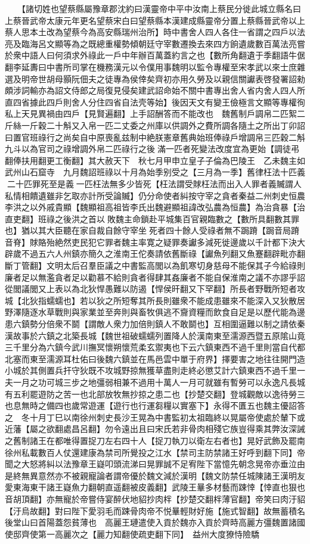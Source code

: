 　　【諸切姓也望蔡縣屬豫章郡沈約曰漢靈帝中平中汝南上蔡民分徙此城立縣名曰上蔡晉武帝太康元年更名望蔡宋白曰望蔡縣本漢建成縣靈帝分置上蔡縣晉武帝以上蔡人思本土改為望蔡今為高安縣瑞州治所】時中書舍人四人各住一省謂之四戶以法亮及臨海呂文顯等為之既總重權勢傾朝廷守宰數遷換去來四方餉遺歲數百萬法亮嘗於衆中語人曰何須求外祿此一戶中年辦百萬蓋約言之也【數所角翻遺于季翻語牛倨翻李延夀曰中書所司掌在機務漢元以令僕用事魏明以監令專權至宋孝武以來士庶雜選及明帝世胡母顥阮佃夫之徒專為侯倖矣齊初亦用久勞及以親信關讞表啓發署詔勑頗涉詞輸亦為詔文侍郎之局復見侵矣建武詔命始不關中書專出舍人省内舍人四人所直四省據此四戶則舍人分住四省自法壳等始】後因天文有變王儉極言文顯等專權徇私上天見異禍由四戶【見賢遍翻】上手詔酬答而不能改也　魏舊制戶調帛二匹絮二斤絲一斤穀二十斛又入帛一匹二丈委之州庫以供調外之費所調各隨土之所出丁卯詔曰置官班祿行之尚矣自中原喪亂兹制中絶朕憲章舊典始班俸祿戶增調帛三匹穀二斛九斗以為官司之祿增調外帛二匹祿行之後滿一匹者死變法改度宜為更始【調徒弔翻俸扶用翻更工衡翻】其大赦天下　秋七月甲申立皇子子倫為巴陵王　乙未魏主如武州山石窟寺　九月魏詔班祿以十月為始季别受之【三月為一季】舊律枉法十匹義二十匹罪死至是義一匹枉法無多少皆死【枉法謂受賕枉法而出入人罪者義贓謂人私情相饋遺雖非乞取亦計所受論贓】仍分命使者糾按守宰之貪者秦益二州刺史恒農李洪之以外戚貴顯【魏顯祖高祖皆李氏出魏避顯祖諱改弘農為恒農】為治貪暴【治直吏翻】班祿之後洪之首以敗魏主命鎖赴平城集百官親臨數之【數所具翻數其罪也】猶以其大臣聽在家自裁自餘守宰坐死者四十餘人受祿者無不跼蹐【跼音局蹐音脊】賕賂殆絶然吏民犯它罪者魏主率寛之疑罪奏讞多減死徙邊歲以千計都下決大辟歲不過五六人州鎮亦簡久之淮南王佗奏請依舊斷祿【讞魚列翻又魚蹇翻辟毗亦翻斷丁管翻】文明太后召羣臣議之中書監高閭以為飢寒切身慈母不能保其子今給祿則廉者足以無濫貪者足以勸慕不給則貪者得肆其姦廉者不能自保淮南之議不亦謬乎詔從閭議閭又上表以為北狄悍愚難以防遏【悍侯旰翻又下罕翻】所長者野戰所短者攻城【北狄指蠕蠕也】若以狄之所短奪其所長則雖衆不能成患雖來不能深入又狄散居野澤隨逐水草戰則與家業並至奔則與畜牧俱逃不齎資糧而飲食自足是以歷代能為邊患六鎮勢分倍衆不鬬【謂敵人衆力加倍則鎮人不敢鬬也】互相圍逼難以制之請依秦漢故事於六鎮之北築長城【魏世祖破蠕蠕列置降人於漢南東至濡源西暨五原隂山竟三千里分為六鎮今武川撫冥懷朔懷荒柔玄禦夷也下云六鎮東西不過千里則當自代都北塞而東至濡源耳杜佑曰後魏六鎮並在馬邑雲中單于府界】擇要害之地往往開門造小城於其側置兵扞守狄既不攻城野掠無獲草盡則走終必懲艾計六鎮東西不過千里一夫一月之功可城三步之地彊弱相兼不過用十萬人一月可就雖有暫勞可以永逸凡長城有五利罷遊防之苦一也北部放牧無抄掠之患二也【抄楚交翻】登城觀敵以逸待勞三也息無時之備四也歲常遊運【遊行也行運芻糧以實塞下】永得不匱五也魏主優詔答之　冬十月丁巳以南徐州刺史長沙王晃為中書監初太祖臨終以晃屬帝使處於輦下或近藩【屬之欲翻處昌呂翻】勿令遠出且曰宋氏若非骨肉相殘它族豈得乘其弊汝深誡之舊制諸王在都唯得置捉刀左右四十人【捉刀執刀以衛左右者也】晃好武飾及罷南徐州私載數百人仗還建康為禁司所覺投之江水【禁司主防禁諸王好呼到翻下同】帝聞之大怒將糾以法豫章王嶷叩頭流涕曰晃罪誠不足宥陛下當憶先朝念晃帝亦垂泣由是終無異意然亦不被親寵論者謂帝優於魏文減於漢明【魏文防禁任城陳諸王漢明友愛東海東干諸王嶷魚力翻朝直遥翻被皮義翻】武陵王曅多材藝而踈悻【悻直也狠也音胡頂翻】亦無寵於帝嘗侍宴醉伏地貂抄肉柈【抄楚交翻柈薄官翻】帝笑曰肉汙貂【汙烏故翻】對曰陛下愛羽毛而踈骨肉帝不悦曅輕財好施【施式智翻】故無蓄積名後堂山曰首陽蓋怨貧薄也　高麗王璉遣使入貢於魏亦入貢於齊時高麗方彊魏置諸國使邸齊使第一高麗次之【麗力知翻使疏吏翻下同】　益州大度獠恃險驕